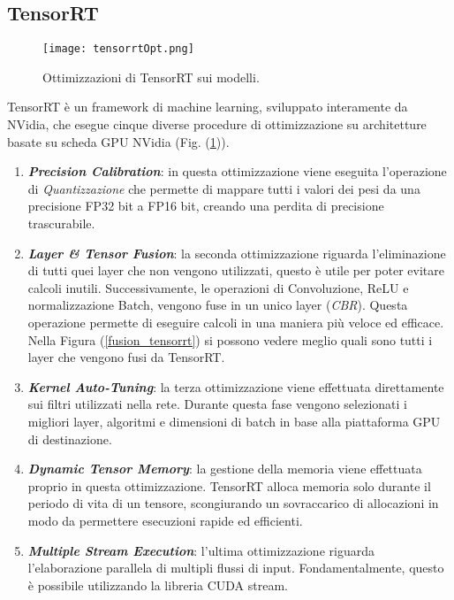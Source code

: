 \subsection{TensorRT}
\begin{figure}
    \centering
    \texttt{[image: tensorrtOpt.png]}
    \centering
    \caption{Ottimizzazioni di TensorRT sui modelli.}
    \label{tensorrt}
\end{figure}
TensorRT è un framework di machine learning, sviluppato interamente da 
NVidia, che esegue cinque diverse procedure di ottimizzazione su architetture 
basate su scheda GPU NVidia (Fig. (\ref{tensorrt})). 
\begin{enumerate}
    \item {\bfseries{\emph{Precision Calibration}}}: in questa ottimizzazione viene eseguita 
    l'operazione di \emph{Quantizzazione} che permette di mappare tutti i valori 
    dei pesi da una precisione FP32 bit a FP16 bit, creando una perdita 
    di precisione trascurabile.
    \item {\bfseries{\emph{Layer \& Tensor Fusion}}}: la seconda ottimizzazione riguarda l'eliminazione 
    di tutti quei layer che non vengono utilizzati, questo è 
    utile per poter evitare calcoli inutili. Successivamente, le operazioni 
    di Convoluzione, ReLU e normalizzazione Batch, vengono fuse in un 
    unico layer (\emph{CBR}). Questa operazione permette di eseguire calcoli 
    in una maniera più veloce ed efficace. Nella Figura (\ref{fusion_tensorrt}) si possono 
    vedere meglio quali sono tutti i layer che vengono fusi da TensorRT.
    \item {\bfseries{\emph{Kernel Auto-Tuning}}}: la terza ottimizzazione viene effettuata direttamente 
    sui filtri utilizzati nella rete. Durante questa fase vengono 
    selezionati i migliori layer, algoritmi e dimensioni di batch in base alla 
    piattaforma GPU di destinazione.
    \item {\bfseries{\emph{Dynamic Tensor Memory}}}: la gestione della memoria viene effettuata 
    proprio in questa ottimizzazione. TensorRT alloca memoria 
    solo durante il periodo di vita di un tensore, scongiurando un 
    sovraccarico di allocazioni in modo da permettere esecuzioni rapide ed efficienti.
    \item {\bfseries{\emph{Multiple Stream Execution}}}: l'ultima ottimizzazione riguarda l'elaborazione 
    parallela di multipli flussi di input. Fondamentalmente, 
    questo è possibile utilizzando la libreria CUDA stream.
\end{enumerate}
